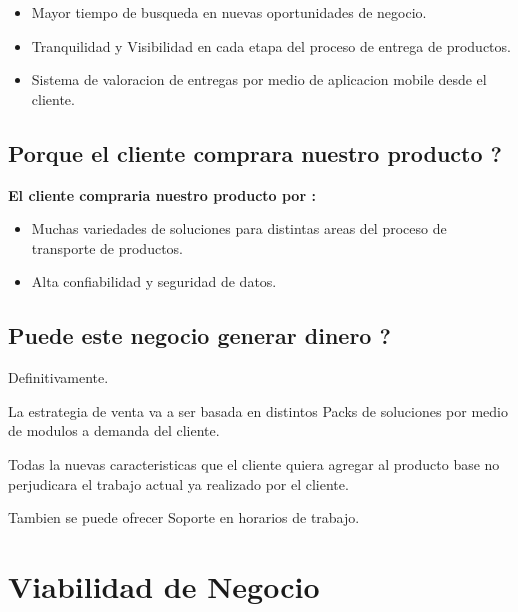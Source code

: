 \documentclass[
10pt, %
a4paper, %
oneside, %
headinclude,footinclude, %
BCOR5mm, %
]{scrartcl}
\begin{document}
\begin{itemize}
    \item { Mayor tiempo de busqueda en nuevas oportunidades de negocio. }
    \item { Tranquilidad y Visibilidad en cada etapa del proceso de entrega
              de productos. }
    \item { Sistema de valoracion de entregas por medio de aplicacion mobile
        desde el cliente. }
\end{itemize}

\subsection{Porque el cliente comprara nuestro producto ?}
\textbf {El cliente compraria nuestro producto por :}

\begin{itemize}
    \item { Muchas variedades de soluciones para distintas areas del proceso
              de transporte de productos. }
    \item { Alta confiabilidad y seguridad de datos. }
\end{itemize}

\subsection{Puede este negocio generar dinero ?}
  Definitivamente.

  La estrategia de venta va a ser basada en
  distintos Packs de soluciones por medio de modulos
  a demanda del cliente.

  Todas la nuevas caracteristicas que el cliente quiera agregar
  al producto base no perjudicara el trabajo actual ya realizado
  por el cliente.

  Tambien se puede ofrecer Soporte en horarios de trabajo.

\section {Viabilidad de Negocio}
\end{document}
